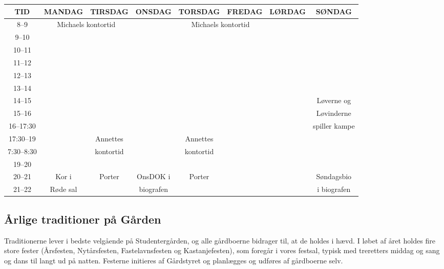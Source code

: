 \documentclass[11pt,article,twoside,openany,danish,extrafontsizes]{memoir} %
\begin{document}
\begin{landscape}
\begin{table}[p]
\begin{center}
\begin{tabular}{|>{\sffamily}c|c|c|c|c|c|c|c|}
\hline
\textsf{TID}		&	\textsf{MANDAG}	& \textsf{TIRSDAG}	& \textsf{ONSDAG}	& \textsf{TORSDAG}	& \textsf{FREDAG}	& \textsf{LØRDAG}	& \textsf{SØNDAG} \\ \hline
\rowcolor{SG-dark!10} 8--9	& \multicolumn{2}{|c|}{Michaels kontortid}	& & \multicolumn{2}{|c|}{Michaels kontortid} & & \\ \hline
\rowcolor{SG-dark!05} 9--10	& & & & & & & \\ \hline
\rowcolor{SG-dark!10} 10--11	& & & & & & & \\ \hline
\rowcolor{SG-dark!15} 11--12	& & & & & & & \\ \hline
\rowcolor{SG-dark!20} 12--13	& & & & & & & \\ \hline
\rowcolor{SG-dark!25} 13--14	& & & & & & & \\ \hline
\rowcolor{SG-dark!30} 14--15	& & & & & & & Løverne og \\ \cline{1-7}
\rowcolor{SG-dark!35} 15--16	& & & & & & & Løvinderne \\ \cline{1-7}
\rowcolor{SG-dark!40} 16--17:30	& & & & & & & spiller kampe \\ \hline
\rowcolor{SG-dark!45} 17:30--19	& & Annettes & & Annettes & & & \\ \cline{1-2} \cline{4-4} \cline{6-8}
\rowcolor{SG-dark!50} 7:30--8:30& & kontortid & & kontortid & & & \\ \hline
\rowcolor{SG-dark!55} 19--20	& & & & & & & \\ \hline
\rowcolor{SG-dark!60} 20--21	& Kor i & Porter & OnsDOK i & Porter & & & Søndagsbio \\ \cline{1-1} \cline{6-8}
\rowcolor{SG-dark!65} 21--22	& Røde sal & & biografen & & & & i biografen \\ \hline
\end{tabular}
\end{center}
\end{table}
\end{landscape}


\subsection{Årlige traditioner på Gården}
Traditionerne lever i bedste velgående på Studentergården, og alle gårdboerne bidrager til, at de holdes i hævd. I løbet af året holdes fire store fester (Årsfesten, Nytårsfesten, Fastelavnsfesten og Kastanjefesten), som foregår i vores festsal, typisk med treretters middag og sang og dans til langt ud på natten. Festerne initieres af Gårdstyret og planlægges og udføres af gårdboerne selv.
\end{document}
